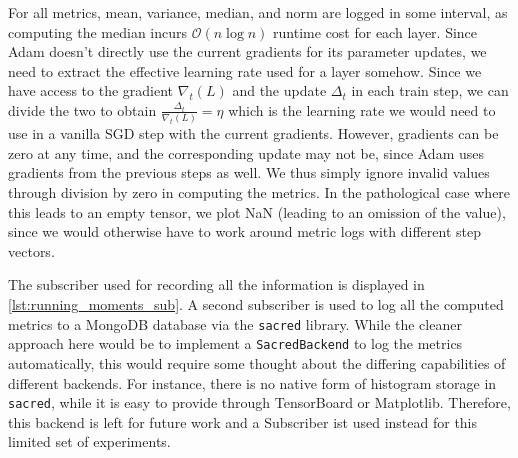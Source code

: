For all metrics, mean, variance, median, and norm are logged in some interval,
as computing the median incurs $\mathcal{O}(n\log n)$ runtime cost for each
layer. Since Adam doesn't directly use the current gradients for its parameter
updates, we need to extract the effective learning rate used for a layer
somehow. Since we have access to the gradient $\nabla_t(L)$ and the update
$\Delta_t$ in each train step, we can divide the two to obtain
$\frac{\Delta_t}{\nabla_t(L)}=\eta$ which is the learning rate we would need to
use in a vanilla SGD step with the current gradients. However, gradients can be
zero at any time, and the corresponding update may not be, since Adam uses
gradients from the previous steps as well. We thus simply ignore invalid values
through division by zero in computing the metrics. In the pathological case
where this leads to an empty tensor, we plot NaN (leading to an omission of the
value), since we would otherwise have to work around metric logs with different
step vectors.

The subscriber used for recording all the information is displayed in
\cref{lst:running_moments_sub}. A second subscriber is used to log all the
computed metrics to a MongoDB database via the \texttt{sacred} library. While
the cleaner approach here would be to implement a \texttt{SacredBackend} to log
the metrics automatically, this would require some thought about the differing
capabilities of different backends. For instance, there is no native form of
histogram storage in \texttt{sacred}, while it is easy to provide through
TensorBoard or Matplotlib. Therefore, this backend is left for future work and a
Subscriber ist used instead for this limited set of experiments.

